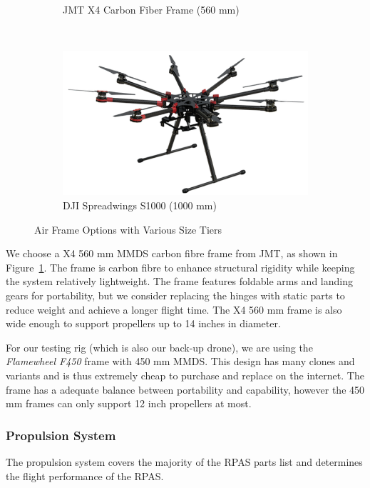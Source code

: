 \begin{figure}[h]
\begin{subfigure}[b]{0.33\textwidth}
        \caption{JMT X4 Carbon Fiber Frame (560 mm)}
        \label{fig:jmtx4}
    \end{subfigure}
    ~
    \begin{subfigure}[b]{0.33\textwidth}
        \centering
        \includegraphics[width=\textwidth]{img/djis1000}
        \caption{DJI Spreadwings S1000 (1000 mm)}
        \label{fig:djis1000}
    \end{subfigure}
    
    \caption{Air Frame Options with Various Size Tiers }
\end{figure}

We choose a X4 560 mm MMDS carbon fibre frame from JMT, as shown in Figure~\ref{fig:jmtx4}. The frame is carbon fibre to enhance structural rigidity while keeping the system relatively lightweight. The frame features foldable arms and landing gears for portability, but we consider replacing the hinges with static parts to reduce  weight and achieve a longer flight time. The X4 560 mm frame is also wide enough to support propellers up to 14 inches in diameter. 

For our testing rig (which is also our back-up drone), we are using the \textit{Flamewheel F450} frame with 450 mm MMDS. This design has many clones and variants and is thus extremely cheap to purchase and replace on the internet. The frame has a adequate balance between portability and capability, however the 450 mm frames can only support 12 inch propellers at most.

\subsubsection{Propulsion System}\label{section:propsys}

The propulsion system covers the majority of the RPAS parts list and determines the flight performance of the RPAS. 

